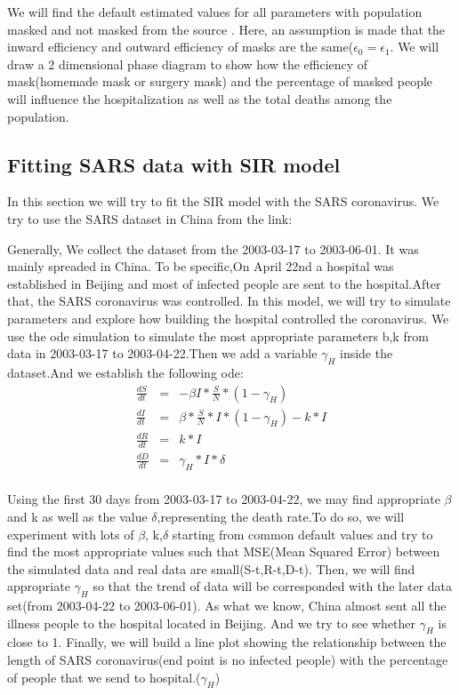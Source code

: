 \documentclass{article}
\begin{document}
We will find the default estimated values for all parameters with population masked and not masked from the source \cite{Steff2020mask}.
Here, an assumption is made that the inward efficiency and outward efficiency of masks are the same($\epsilon_{0} = \epsilon_{1}$. We will draw a 2 dimensional phase diagram to show how the efficiency of mask(homemade mask or surgery mask) and the percentage of masked people will influence the hospitalization as well as the total deaths among the population.






\subsection{Fitting SARS data with SIR model}
In this section we will try to fit the SIR model with the SARS  coronavirus. We try to use the SARS dataset in China from the link:\cite{SARSsource}

Generally, We collect the dataset from the 2003-03-17 to 2003-06-01. It was mainly spreaded in China. To be specific,On April 22nd a hospital was established in Beijing and most of infected people are sent to the hospital.After that, the SARS coronavirus was controlled. In this model, we will try to simulate parameters and explore how building the hospital controlled the coronavirus. We use the ode simulation to simulate the most appropriate parameters b,k from data in 2003-03-17 to 2003-04-22.Then we add a variable $\gamma_{H}$ inside the dataset.And we establish the following ode:
\begin{eqnarray}
  \frac{dS}{dt} &=& -\beta I*\frac{S}{N}*(1-\gamma_{H})\\
  \frac{dI}{dt} &=& \beta *\frac{S}{N}*I*(1-\gamma_{H})- k*I\\
  \frac{dR}{dt} &=& k*I\\
  \frac{dD}{dt} &=& \gamma_{H}*I*\delta\\
\end{eqnarray}

Using the first 30 days from 2003-03-17 to 2003-04-22, we may find appropriate $\beta$ and k as well as the value $\delta$,representing the death rate.To do so, we will experiment with lots of $\beta$, k,$\delta$ starting from common default values and try to find the most appropriate values such that MSE(Mean Squared Error) between the simulated data and real data are small(S-t,R-t,D-t).  Then, we will find appropriate $\gamma_{H}$ so that the trend of data will be corresponded with the later data set(from  2003-04-22 to 2003-06-01). As what we know, China almost sent all the illness people to the hospital located in Beijing. And we try to see whether $\gamma_{H}$ is close to 1.
Finally, we will build a line plot showing the relationship between the length of SARS coronavirus(end point is no infected people) with the percentage of people that we send to hospital.($\gamma_{H}$)
\end{document}
